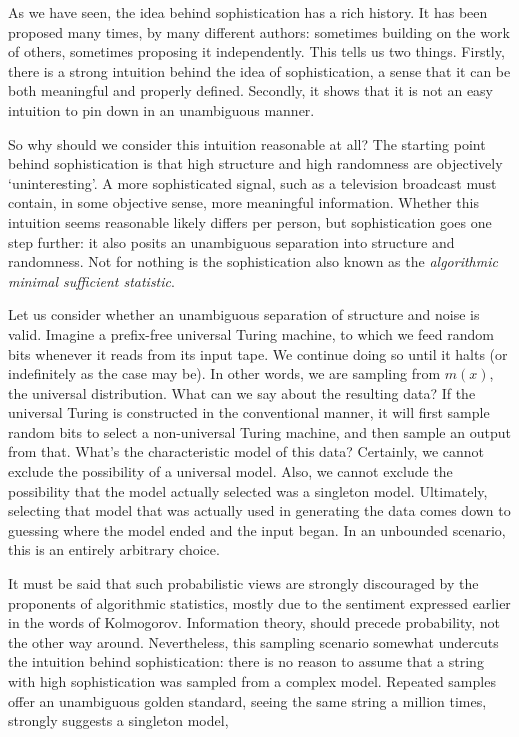 \documentclass{style/llncs}
\begin{document}
As we have seen, the idea behind sophistication has a rich history. It has been proposed many times, by many different authors: sometimes building on the work of others, sometimes proposing it independently. This tells us two things. Firstly, there is a strong intuition behind the idea of sophistication, a sense that it can be both meaningful and properly defined. Secondly, it shows that it is not an easy intuition to pin down in an unambiguous manner.

So why should we consider this intuition reasonable at all? The starting point behind sophistication is that high structure and high randomness are objectively `uninteresting'. A more sophisticated signal, such as a television broadcast must contain, in some objective sense, more meaningful information. Whether this intuition seems reasonable likely differs per person, but sophistication goes one step further: it also posits an unambiguous separation into structure and randomness. Not for nothing is the sophistication also known as the \emph{algorithmic minimal sufficient statistic}.

Let us consider whether an unambiguous separation of structure and noise is valid. Imagine a prefix-free universal Turing machine, to which we feed random bits whenever it reads from its input tape. We continue doing so until it halts (or indefinitely as the case may be). In other words, we are sampling from $m(x)$, the universal distribution. What can we say about the resulting data? If the universal Turing is constructed in the conventional manner, it will first sample random bits to select a non-universal Turing machine, and then sample an output from that. What's the characteristic model of this data? Certainly, we cannot exclude the possibility of a universal model. Also, we cannot exclude the possibility that the model actually selected was a singleton model. Ultimately, selecting that model that was actually used in generating the data comes down to guessing where the model ended and the input began. In an unbounded scenario, this is an entirely arbitrary choice.

It must be said that such probabilistic views are strongly discouraged by the proponents of algorithmic statistics, mostly due to the sentiment expressed earlier in the words of Kolmogorov. Information theory, should precede probability, not the other way around. Nevertheless, this sampling scenario somewhat undercuts the intuition behind sophistication: there is no reason to assume that a string with high sophistication was sampled from a complex model. Repeated samples offer an unambiguous golden standard, seeing the same string a million times, strongly suggests a singleton model, 
\end{document}

